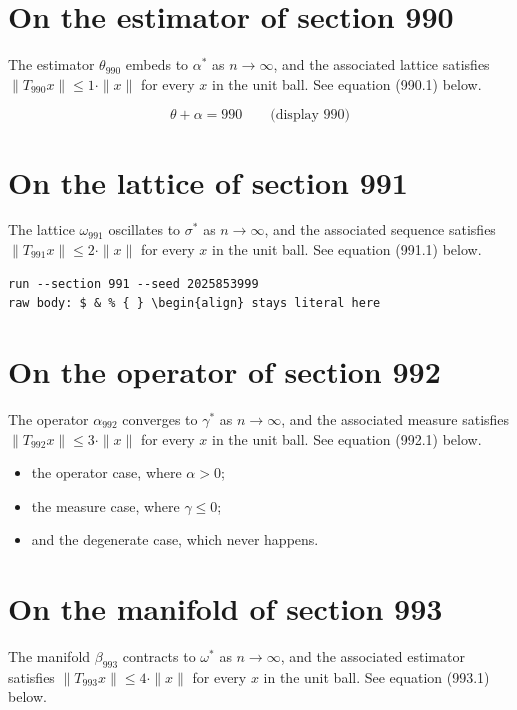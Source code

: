 \documentclass{article}
\begin{document}
\section{On the estimator of section 990}
The estimator $\theta_{990}$ embeds to $\alpha^{*}$ as $n \to \infty$,
and the associated lattice satisfies $\|T_{990} x\| \leq 1 \cdot \|x\|$
for every $x$ in the unit ball. See equation (990.1) below.

$$
\theta + \alpha = 990 \qquad \text{(display 990)}
$$

\section{On the lattice of section 991}
The lattice $\omega_{991}$ oscillates to $\sigma^{*}$ as $n \to \infty$,
and the associated sequence satisfies $\|T_{991} x\| \leq 2 \cdot \|x\|$
for every $x$ in the unit ball. See equation (991.1) below.

\begin{verbatim}
run --section 991 --seed 2025853999
raw body: $ & % { } \begin{align} stays literal here
\end{verbatim}

\section{On the operator of section 992}
The operator $\alpha_{992}$ converges to $\gamma^{*}$ as $n \to \infty$,
and the associated measure satisfies $\|T_{992} x\| \leq 3 \cdot \|x\|$
for every $x$ in the unit ball. See equation (992.1) below.

\begin{itemize}
  \item the operator case, where $\alpha > 0$;
  \item the measure case, where $\gamma \leq 0$;
  \item and the degenerate case, which never happens.
\end{itemize}

\section{On the manifold of section 993}
The manifold $\beta_{993}$ contracts to $\omega^{*}$ as $n \to \infty$,
and the associated estimator satisfies $\|T_{993} x\| \leq 4 \cdot \|x\|$
for every $x$ in the unit ball. See equation (993.1) below.
\end{document}
